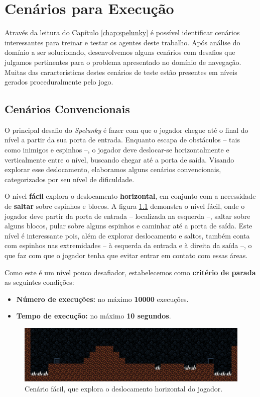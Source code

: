 \chapter{\label{chap:scenarios}Cenários para Execução}
Através da leitura do Capítulo \ref{chap:spelunky} é possível identificar
cenários interessantes para treinar e testar os agentes deste trabalho. Após
análise do domínio a ser solucionado, desenvolvemos alguns cenários com desafios
que julgamos pertinentes para o problema apresentado no domínio de navegação.
Muitas das características destes cenários de teste estão presentes em níveis
gerados proceduralmente pelo jogo.

\section{Cenários Convencionais}

O principal desafio do \textit{Spelunky} é fazer com que o jogador chegue até
o final do nível a partir da sua porta de entrada. Enquanto escapa de
obstáculos -- tais como inimigos e espinhos --, o jogador deve deslocar-se
horizontalmente e verticalmente entre o nível, buscando chegar até a porta de
saída. Visando explorar esse deslocamento, elaboramos alguns cenários
convencionais, categorizados por seu nível de dificuldade.

O nível \textbf{fácil} explora o deslocamento \textbf{horizontal}, em conjunto
com a necessidade de \textbf{saltar} sobre espinhos e blocos. A figura
\ref{fig:level1} demonstra o nível fácil, onde o jogador deve partir da porta de
entrada -- localizada na esquerda --, saltar sobre alguns blocos, pular sobre
alguns espinhos e caminhar até a porta de saída. Este nível é interessante pois,
além de explorar deslocamento e saltos, também conta com espinhos nas
extremidades -- à esquerda da entrada e à direita da saída --, o que faz com que
o jogador tenha que evitar entrar em contato com essas áreas.

Como este é um nível pouco desafiador, estabelecemos como \textbf{critério de
parada} as seguintes condições:

\begin{itemize}
	\item \textbf{Número de execuções:} no máximo \textbf{10000} execuções.
	\item \textbf{Tempo de execução:} no máximo \textbf{10 segundos}.
\end{itemize}

\begin{figure}[H]
\centering
\includegraphics[width=\textwidth]{fig/levels/level1.pdf}
\caption{Cenário fácil, que explora o deslocamento horizontal do jogador.}
\label{fig:level1}
\end{figure}

